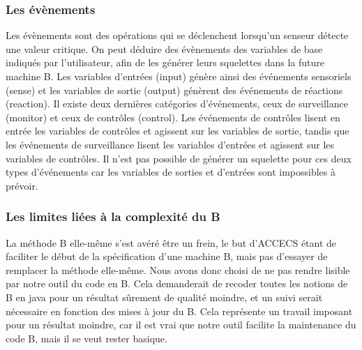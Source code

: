 \documentclass[a4paper]{article}
\begin{document}
\subsubsection{Les évènements}
    Les évènements sont des opérations qui se déclenchent lorsqu'un senseur détecte une valeur critique. On peut déduire des évènements des variables de base indiqués par l'utilisateur, afin de les générer leurs squelettes dans la future machine B. Les variables d'entrées (input) génère ainsi des événements sensoriels (sense) et les variables de sortie (output) génèrent des événements de réactions (reaction). Il existe deux dernières catégories d'événements, ceux de surveillance (monitor) et ceux de contrôles (control). Les événements de contrôles lisent en entrée les variables de contrôles et agissent sur les variables de sortie, tandis que les événements de surveillance lisent les variables d'entrées et agissent sur les variables de contrôles. Il n'est pas possible de générer un squelette pour ces deux types d'événements car les variables de sorties et d'entrées sont impossibles à prévoir.
    
\subsubsection{Les limites liées à la complexité du B}
    La méthode B elle-même s'est avéré être un frein, le but d'ACCECS étant de faciliter le début de la spécification d'une machine B, mais pas d'essayer de remplacer la méthode elle-même. Nous avons donc choisi de ne pas rendre lisible par notre outil du code en B. Cela demanderait de recoder toutes les notions de B en java pour un résultat sûrement de qualité moindre, et un suivi serait nécessaire en fonction des mises à jour du B. Cela représente un travail imposant pour un résultat moindre, car il est vrai que notre outil facilite la maintenance du code B, mais il se veut rester basique.
    
\end{document}
